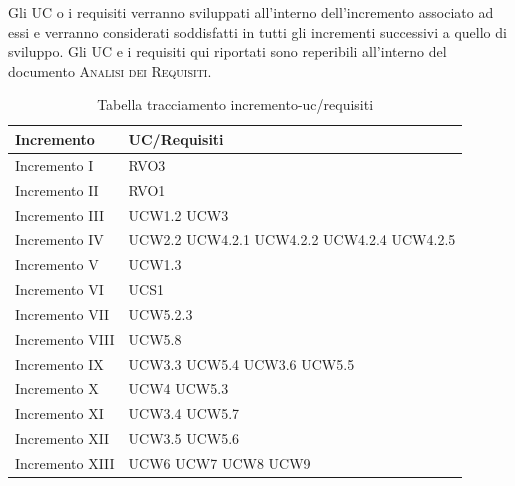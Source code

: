 \documentclass[../piano_di_progetto.tex]{subfiles}
\begin{document}
Gli UC o i requisiti verranno sviluppati all'interno dell'incremento associato ad essi e verranno considerati soddisfatti in tutti gli incrementi successivi a quello di sviluppo. Gli UC e i requisiti qui riportati sono reperibili all'interno del documento \textsc{Analisi dei Requisiti}.
\begin{table}[!ht]
	\centering
	\begin{tabular}{|p{3cm}|p{3cm}|}
	\hline
	\rowcolor{lightgray}
	\textbf{Incremento} & \textbf{UC/Requisiti}\\
	\hline
        Incremento I & RVO3\\
        Incremento II & RVO1\\
        Incremento III & UCW1.2  UCW3 \\
        Incremento IV & UCW2.2 UCW4.2.1 UCW4.2.2 UCW4.2.4 UCW4.2.5\\
        Incremento V & UCW1.3\\
        Incremento VI & UCS1\\ %
        Incremento VII & UCW5.2.3\\ %
        Incremento VIII & UCW5.8 \\ %
        Incremento IX & UCW3.3 UCW5.4 UCW3.6  UCW5.5\\ %
        Incremento X & UCW4 UCW5.3\\ %
        Incremento XI & UCW3.4 UCW5.7\\ %
        Incremento XII & UCW3.5 UCW5.6\\ %
        Incremento XIII & UCW6 UCW7 UCW8 UCW9\\ %
        
    \hline	
	\end{tabular}
	\caption{Tabella tracciamento incremento-uc/requisiti}
\end{table}
\end{document}

